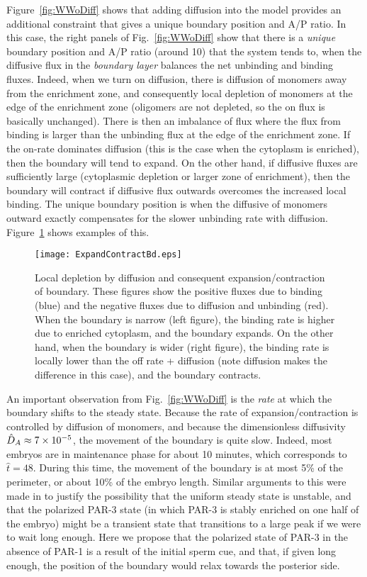 \documentclass[11pt]{article}
\newcommand{\6}[1]{#1_{\text{6}}}
\newcommand{\3}[1]{#1_{\text{3}}}
\begin{document}
Figure\ \ref{fig:WWoDiff} shows that adding diffusion into the model provides an additional constraint that gives a unique boundary position and A/P ratio. In this case, the right panels of Fig.\ \ref{fig:WWoDiff} show that there is a \emph{unique} boundary position and A/P ratio (around 10) that the system tends to, when the diffusive flux in the \emph{boundary layer} balances the net unbinding and binding fluxes. Indeed, when we turn on diffusion, there is diffusion of monomers away from the enrichment zone, and consequently local depletion of monomers at the edge of the enrichment zone (oligomers are not depleted, so the on flux is basically unchanged). There is then an imbalance of flux where the flux from binding is larger than the unbinding flux at the edge of the enrichment zone. If the on-rate dominates diffusion (this is the case when the cytoplasm is enriched), then the boundary will tend to expand. On the other hand, if diffusive fluxes are sufficiently large (cytoplasmic depletion or larger zone of enrichment), then the boundary will contract if diffusive flux outwards overcomes the increased local binding. The unique boundary position is when the diffusive of monomers outward exactly compensates for the slower unbinding rate with diffusion. Figure\ \ref{fig:ExpContrBd} shows examples of this.

\begin{figure}
\centering
\texttt{[image: ExpandContractBd.eps]}
\caption{\label{fig:ExpContrBd}Local depletion by diffusion and consequent expansion/contraction of boundary. These figures show the positive fluxes due to binding (blue) and the negative fluxes due to diffusion and unbinding (red). When the boundary is narrow (left figure), the binding rate is higher due to enriched cytoplasm, and the boundary expands. On the other hand, when the boundary is wider (right figure), the binding rate is locally lower than the off rate + diffusion (note diffusion makes the difference in this case), and the boundary contracts. }
\end{figure}

An important observation from Fig.\ \ref{fig:WWoDiff} is the \emph{rate} at which the boundary shifts to the steady state. Because the rate of expansion/contraction is controlled by diffusion of monomers, and because the dimensionless diffusivity $\hat{D}_A \approx 7 \times 10^{-5}$,  the movement of the boundary is quite slow. Indeed, most embryos are in maintenance phase for about 10 minutes, which corresponds to $\hat t = 48$. During this time, the movement of the boundary is at most 5\% of the perimeter, or about 10\% of the embryo length. Similar arguments to this were made in \cite{lang2022oligomerization} to justify the possibility that the uniform steady state is unstable, and that the polarized PAR-3 state (in which PAR-3 is stably enriched on one half of the embryo) \cite{lang2023oligomerization} might be a transient state that transitions to a large peak if we were to wait long enough. Here we propose that the polarized state of PAR-3 in the absence of PAR-1 is a result of the initial sperm cue, and that, if given long enough, the position of the boundary would relax towards the posterior side.
\end{document}
